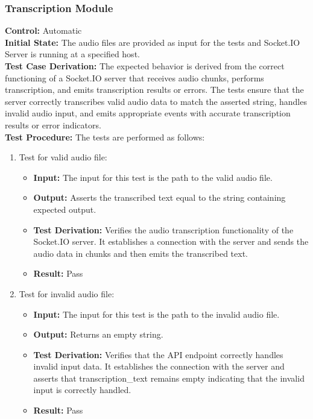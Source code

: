 \documentclass[12pt, titlepage]{article}
\begin{document}
  \subsubsection{Transcription Module}

  \textbf{Control:} Automatic\\
  \textbf{Initial State:} The audio files are provided as input for the tests and Socket.IO Server is running at a specified host.\\
  \textbf{Test Case Derivation:} The expected behavior is derived from the correct functioning of a Socket.IO server that receives audio chunks, performs transcription, and emits transcription results or errors. The tests ensure that the server correctly transcribes valid audio data to match the asserted string, handles invalid audio input, and emits appropriate events with accurate transcription results or error indicators.\\
  \textbf{Test Procedure:} The tests are performed as follows:\\

  \begin{enumerate}
    \item Test for valid audio file:
      \begin{itemize}
        \item \textbf{Input:} The input for this test is the path to the valid audio file.   
        \item \textbf{Output:} Asserts the transcribed text equal to the string containing expected output.
        \item \textbf{Test Derivation:} Verifies the audio transcription functionality of the Socket.IO server. It establishes a connection with the server and sends the audio data in chunks and then emits the transcribed text. 
        \item \textbf{Result:} Pass
      \end{itemize}

    \item Test for invalid audio file:
      \begin{itemize}
        \item \textbf{Input:} The input for this test is the path to the invalid audio file. 
        \item \textbf{Output:} Returns an empty string.  
        \item \textbf{Test Derivation:} Verifies that the API endpoint correctly handles invalid input data. It establishes the connection with the server and asserts that transcription\_text remains empty indicating that the invalid input is correctly handled.
        \item \textbf{Result:} Pass
      \end{itemize}
  \end{enumerate}
\end{document}
